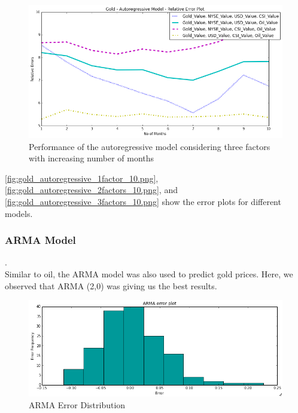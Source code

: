 \documentclass[runningheads]{llncs}
\begin{document}
\begin{figure}
\centering
\includegraphics[width=\textwidth]{gold_autoregressive_3factors_10.png}
\caption{Performance of the autoregressive model considering three factors with increasing number of months}
\label{fig:gold_autoregressive_3factors_10.png}
\end{figure}

\noindent \autoref{fig:gold_autoregressive_1factor_10.png}, \autoref{fig:gold_autoregressive_2factors_10.png}, and \autoref{fig:gold_autoregressive_3factors_10.png} show the error plots for different models. 

\newpage
\newpage
\subsubsection {ARMA Model}.\\

Similar to oil, the ARMA model was also used to predict gold prices. Here, we observed that ARMA (2,0) was giving us the best results.

\begin{center}
\begin{figure}
\centering
\includegraphics[width=\textwidth]{arma_error_histogram_gold.png}
\caption{ARMA Error Distribution}
\label{fig:arma_error_histogram_gold.png}
\end{figure}
\end{center}
\end{document}

